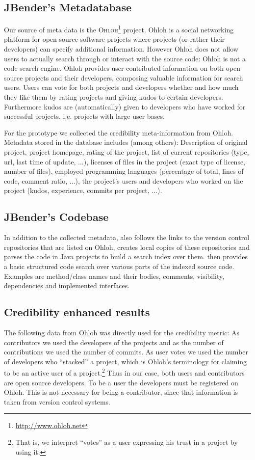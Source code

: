 \subsection{JBender's Metadatabase}
Our source of meta data is the \textsc{Ohloh}\footnote{\url{http://www.ohloh.net}} project. Ohloh is a social networking platform for open source software projects where projects (or rather their developers) can specify additional information. However Ohloh does not allow users to actually search through or interact with the source code: Ohloh is not a code search engine. Ohloh provides user contributed information on both open source projects and their developers, composing valuable information for search users. Users can vote for both projects and developers whether and how much they like them by rating projects and giving kudos to certain developers. Furthermore kudos are (automatically) given to developers who have worked for successful projects, i.e. projects with large user bases. 

For the \Jbd prototype we collected the credibility meta-information from Ohloh.
Metadata stored in the database includes (among others): Description of original project, project homepage, rating of the project, list of current repositories (type, url, last time of update, ...), licenses of files in the project (exact type of license, number of files), employed programming languages (percentage of total, lines of code, comment ratio, ...), the project's users and developers who worked on the project (kudos, experience, commits per project, ...).

\subsection{JBender's Codebase}
In addition to the collected metadata, \Jbd also follows the links to the version control repositories that are listed on Ohloh, creates local copies of these repositories and parses the code in Java projects to build a search index over them.
\Jbd then provides a basic structured code search over various parts of the indexed source code. Examples are method/class names and their bodies, comments, visibility, dependencies and implemented interfaces.

\subsection{Credibility enhanced results}

The following data from Ohloh was directly used for the credibility metric: As contributors we used the developers of the projects and as the number of contributions we used the number of commits. As user votes we used the number of developers who ``stacked'' a project, which is Ohloh's terminology for claiming to be an active user of a project.\footnote{That is, we interpret ``votes'' as a user expressing his trust in a project by using it.} Thus in our case, both users and contributors are open source developers. To be a user the developers must be registered on Ohloh.  This is not necessary for being a contributor, since that information is taken from version control systems.

